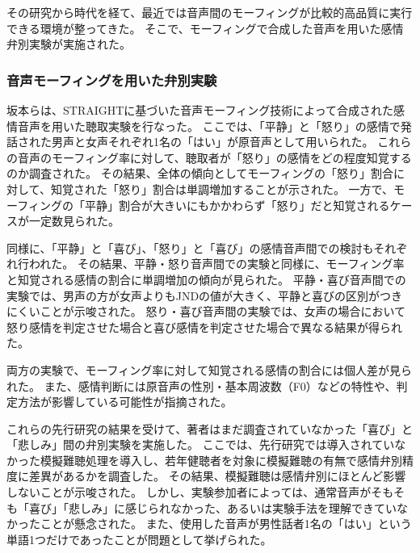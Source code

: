 その研究\cite{laukka2005categorical}から時代を経て、最近では音声間のモーフィングが比較的高品質に実行できる環境が整ってきた\cite{matsui2003STRAIGHT,kawahara2024interactive}。
そこで、モーフィングで合成した音声を用いた感情弁別実験が実施された。

\subsubsection{音声モーフィングを用いた弁別実験}
坂本らは、STRAIGHTに基づいた音声モーフィング技術\cite{matsui2003STRAIGHT}によって合成された感情音声を用いた聴取実験を行なった\cite{sakamoto2020morphEmo}。
ここでは、「平静」と「怒り」の感情で発話された男声と女声それぞれ1名の「はい」が原音声として用いられた。
これらの音声のモーフィング率に対して、聴取者が「怒り」の感情をどの程度知覚するのか調査された。
その結果、全体の傾向としてモーフィングの「怒り」割合に対して、知覚された「怒り」割合は単調増加することが示された。
一方で、モーフィングの「平静」割合が大きいにもかかわらず「怒り」だと知覚されるケースが一定数見られた。

同様に、「平静」と「喜び」、「怒り」と「喜び」の感情音声間での検討もそれぞれ行われた\cite{sakamoto2021morphEmo}。
その結果、平静・怒り音声間での実験と同様に、モーフィング率と知覚される感情の割合に単調増加の傾向が見られた。
平静・喜び音声間での実験では、男声の方が女声よりもJNDの値が大きく、平静と喜びの区別がつきにくいことが示唆された。
怒り・喜び音声間の実験では、女声の場合において怒り感情を判定させた場合と喜び感情を判定させた場合で異なる結果が得られた。

両方の実験で、モーフィング率に対して知覚される感情の割合には個人差が見られた。
また、感情判断には原音声の性別・基本周波数（F0）などの特性や、判定方法が影響している可能性が指摘された。


これらの先行研究\cite{sakamoto2021morphEmo,sakamoto2021morphEmo}の結果を受けて、著者はまだ調査されていなかった「喜び」と「悲しみ」間の弁別実験を実施した\cite{hanatani2023Emo}。
ここでは、先行研究\cite{sakamoto2021morphEmo,sakamoto2021morphEmo}では導入されていなかった模擬難聴処理を導入し、若年健聴者を対象に模擬難聴の有無で感情弁別精度に差異があるかを調査した。
その結果、模擬難聴は感情弁別にほとんど影響しないことが示唆された。
しかし、実験参加者によっては、通常音声がそもそも「喜び」「悲しみ」に感じられなかった、あるいは実験手法を理解できていなかったことが懸念された。
また、使用した音声が男性話者1名の「はい」という単語1つだけであったことが問題として挙げられた。

